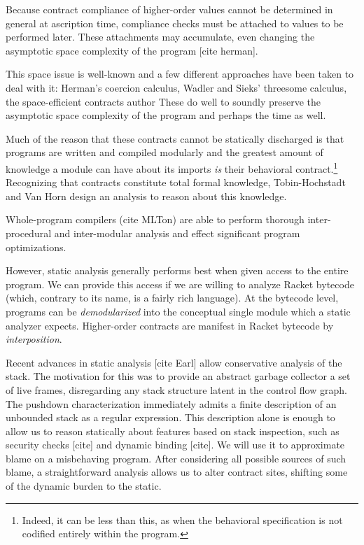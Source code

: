 \documentclass{sigplanconf}
\begin{document}
Because contract compliance of higher-order values cannot be determined in general at ascription time, compliance checks must be attached to values to be performed later.
These attachments may accumulate, even changing the asymptotic space complexity of the program [cite herman].

This space issue is well-known and a few different approaches have been taken to deal with it:
Herman's coercion calculus, Wadler and Sieks' threesome calculus, the space-efficient contracts author
These do well to soundly preserve the asymptotic space complexity of the program and perhaps the time as well.

Much of the reason that these contracts cannot be statically discharged is that programs are written and compiled modularly and the greatest amount of knowledge a module can have about its imports \emph{is} their behavioral contract.\footnote{Indeed, it can be less than this, as when the behavioral specification is not codified entirely within the program.} Recognizing that contracts constitute total formal knowledge, Tobin-Hochstadt and Van Horn \cite{tobin2012higher} design an analysis to reason about this knowledge.


Whole-program compilers (cite MLTon) are able to perform thorough inter-procedural and inter-modular analysis and effect significant program optimizations.

However, static analysis generally performs best when given access to the entire program.
We can provide this access if we are willing to analyze Racket bytecode (which, contrary to its name, is a fairly rich language).
At the bytecode level, programs can be \emph{demodularized} into the conceptual single module which a static analyzer expects.
Higher-order contracts are manifest in Racket bytecode by \emph{interposition}.

Recent advances in static analysis [cite Earl] %
allow conservative analysis of the stack.
The motivation for this was to provide an abstract garbage collector a set of live frames, disregarding any stack structure latent in the control flow graph.
The pushdown characterization immediately admits a finite description of an unbounded stack as a regular expression.
This description alone is enough to allow us to reason statically about features based on stack inspection, such as security checks [cite] and dynamic binding [cite].
We will use it to approximate blame on a misbehaving program.
After considering all possible sources of such blame, a straightforward analysis allows us to alter contract sites, shifting some of the dynamic burden to the static.
\end{document}
